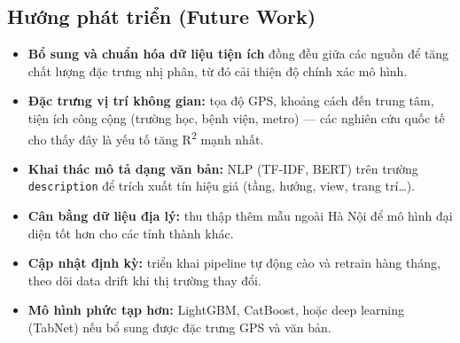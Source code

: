 \subsection{Hướng phát triển (Future Work)}

\begin{itemize}[leftmargin=*, itemsep=3pt]
  \item \textbf{Bổ sung và chuẩn hóa dữ liệu tiện ích} đồng đều giữa các nguồn để
        tăng chất lượng đặc trưng nhị phân, từ đó cải thiện độ chính xác mô hình.
  \item \textbf{Đặc trưng vị trí không gian:} tọa độ GPS, khoảng cách đến trung tâm,
        tiện ích công cộng (trường học, bệnh viện, metro) — các nghiên cứu quốc tế
        cho thấy đây là yếu tố tăng R\textsuperscript{2} mạnh nhất.
  \item \textbf{Khai thác mô tả dạng văn bản:} NLP (TF-IDF, BERT) trên trường
        \texttt{description} để trích xuất tín hiệu giá (tầng, hướng, view, trang trí…).
  \item \textbf{Cân bằng dữ liệu địa lý:} thu thập thêm mẫu ngoài Hà Nội
        để mô hình đại diện tốt hơn cho các tỉnh thành khác.
  \item \textbf{Cập nhật định kỳ:} triển khai pipeline tự động cào và retrain
        hàng tháng, theo dõi data drift khi thị trường thay đổi.
  \item \textbf{Mô hình phức tạp hơn:} LightGBM, CatBoost, hoặc deep learning
        (TabNet) nếu bổ sung được đặc trưng GPS và văn bản.
\end{itemize}
